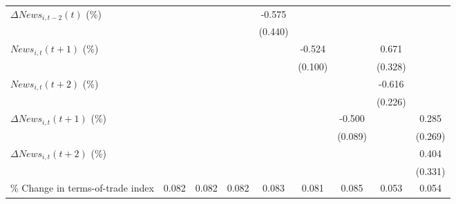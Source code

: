 {\begin{tabular}{l*{8}{c}}
\addlinespace
$ \Delta News_{i,t-2}(t)$ (\%)&                     &                     &                     &      -0.575         &                     &                     &                     &                     \\
                    &                     &                     &                     &     (0.440)         &                     &                     &                     &                     \\
\addlinespace
$ News_{i,t}(t+1)$ (\%)&                     &                     &                     &                     &      -0.524\sym{***}&                     &       0.671\sym{*}  &                     \\
                    &                     &                     &                     &                     &     (0.100)         &                     &     (0.328)         &                     \\
\addlinespace
$ News_{i,t}(t+2)$ (\%)&                     &                     &                     &                     &                     &                     &      -0.616\sym{**} &                     \\
                    &                     &                     &                     &                     &                     &                     &     (0.226)         &                     \\
\addlinespace
$ \Delta News_{i,t}(t+1)$ (\%)&                     &                     &                     &                     &                     &      -0.500\sym{***}&                     &       0.285         \\
                    &                     &                     &                     &                     &                     &     (0.089)         &                     &     (0.269)         \\
\addlinespace
$ \Delta News_{i,t}(t+2)$ (\%)&                     &                     &                     &                     &                     &                     &                     &       0.404         \\
                    &                     &                     &                     &                     &                     &                     &                     &     (0.331)         \\
\addlinespace
\% Change in terms-of-trade index&       0.082         &       0.082         &       0.082         &       0.083         &       0.081         &       0.085         &       0.053         &       0.054         \\

\end{tabular}}
